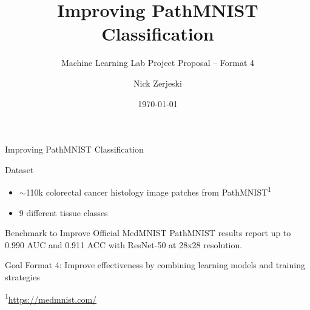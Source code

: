 \documentclass[aspectratio=169]{beamer}
\title[PathMNIST]{Improving PathMNIST Classification}
\subtitle{Machine Learning Lab Project Proposal -- Format 4}
\author{Nick Zerjeski}
\institute{Free University of Bozen-Bolzano}
\date{\today}
\begin{document}
\begin{frame}{Improving PathMNIST Classification}
  \begin{block}{Dataset}
    \begin{itemize}
      \item $\sim$110k colorectal cancer histology image patches from PathMNIST\textsuperscript{1}
      \item 9 different tissue classes
    \end{itemize}
  \end{block}

  \begin{alertblock}{Benchmark to Improve}
    Official MedMNIST PathMNIST results report up to 0.990 AUC and 0.911 ACC with ResNet-50 at 28x28 resolution.
  \end{alertblock}

  \begin{exampleblock}{Goal}
    Format 4: Improve effectiveness by combining learning models and training strategies
  \end{exampleblock}

  \vfill
  {\scriptsize \textsuperscript{1}\url{https://medmnist.com/}}
\end{frame}
\end{document}
